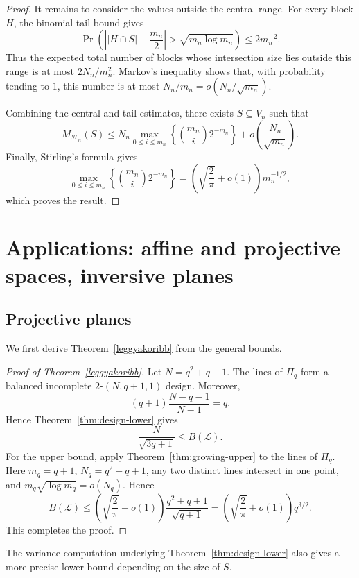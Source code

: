 \documentclass[10pt]{article}
\theoremstyle{definition}
\begin{document}
\begin{proof}
		It remains to consider the values outside the central range. For every block \(H\), the binomial tail bound gives
		\[
		\Pr\left(
		\left||H\cap S|-\frac{m_n}{2}\right|
		>\sqrt{m_n\log m_n}
		\right)
		\leq 2m_n^{-2}.
		\]
		Thus the expected total number of blocks whose intersection size lies outside this range is at most \(2N_n/m_n^2\). Markov's inequality shows that, with probability tending to \(1\), this number is at most \(N_n/m_n=o(N_n/\sqrt{m_n})\).
		
		Combining the central and tail estimates, there exists \(S\subseteq V_n\) such that
		\[
		M_{\mathcal H_n}(S)
		\leq
		N_n\max_{0\leq i\leq m_n}
		\left\{\binom{m_n}{i}2^{-m_n}\right\}
		+o\left(\frac{N_n}{\sqrt{m_n}}\right).
		\]
		Finally, Stirling's formula gives
		\[
		\max_{0\leq i\leq m_n}
		\left\{\binom{m_n}{i}2^{-m_n}\right\}
		=
		\left(\sqrt{\frac{2}{\pi}}+o(1)\right)m_n^{-1/2},
		\]
		which proves the result.
	\end{proof}
	\section{Applications: affine and projective spaces, inversive planes}
	\label{sec:application}
	\subsection[Projective planes]{{Projective planes}}
	
	{We first derive Theorem~\ref{leggyakoribb} from the general bounds.}
	
	\begin{proof}[{Proof of Theorem~\ref{leggyakoribb}}]
		{Let \(N=q^2+q+1\). The lines of \(\Pi_q\) form a balanced incomplete \(2\text{-}(N,q+1,1)\) design. Moreover,}
		\[
		{\ensuremath{(q+1)\frac{N-q-1}{N-1}=q.}}
		\]
		{Hence Theorem~\ref{thm:design-lower} gives}
		\[
		{\ensuremath{\frac{N}{\sqrt{3q+1}}\leq B(\mathcal L).}}
		\]
		{For the upper bound, apply Theorem~\ref{thm:growing-upper} to the lines of \(\Pi_q\). Here \(m_q=q+1\), \(N_q=q^2+q+1\), any two distinct lines intersect in one point, and \(m_q\sqrt{\log m_q}=o(N_q)\). Hence}
		\[
		{\ensuremath{B(\mathcal L)\leq
				\left(\sqrt{\frac{2}{\pi}}+o(1)\right)
				\frac{q^2+q+1}{\sqrt{q+1}}
				=\left(\sqrt{\frac{2}{\pi}}+o(1)\right)q^{3/2}.}}
		\]
		{This completes the proof.}
	\end{proof}
	{The variance computation underlying Theorem~\ref{thm:design-lower} also gives a more precise lower bound depending on the size of \(S\).}
	
\end{document}
